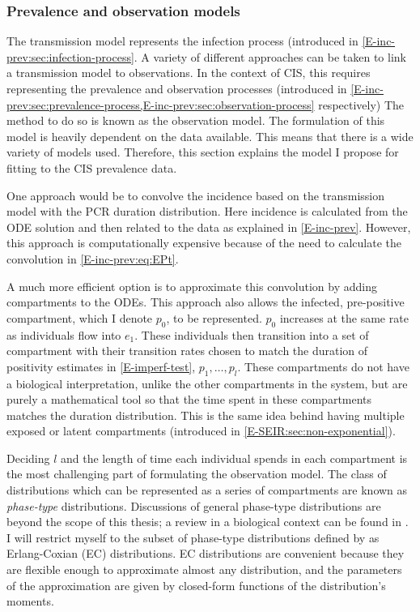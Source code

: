 \documentclass[thesis.tex]{subfiles}
\begin{document}
\subsubsection{Prevalence and observation models} \label{SEIR:sec:observation}

The transmission model represents the infection process (introduced in \cref{E-inc-prev:sec:infection-process}.
A variety of different approaches can be taken to link a transmission model to observations.
In the context of CIS, this requires representing the prevalence and observation processes (introduced in \cref{E-inc-prev:sec:prevalence-process,E-inc-prev:sec:observation-process} respectively)
The method to do so is known as the observation model.
The formulation of this model is heavily dependent on the data available.
This means that there is a wide variety of models used.
Therefore, this section  explains the model I propose for fitting to the CIS prevalence data.

One approach would be to convolve the incidence based on the transmission model with the PCR duration distribution.
Here incidence is calculated from the ODE solution and then related to the data as explained in \cref{E-inc-prev}.
However, this approach is computationally expensive because of the need to calculate the convolution in \cref{E-inc-prev:eq:EPt}.

A much more efficient option is to approximate this convolution by adding compartments to the ODEs.
This approach also allows the infected, pre-positive compartment, which I denote $p_0$, to be represented.
$p_0$ increases at the same rate as individuals flow into $e_1$.
These individuals then transition into a set of compartment with their transition rates chosen to match the duration of positivity estimates in \cref{E-imperf-test}, $p_1, \dots, p_l$.
These compartments do not have a biological interpretation, unlike the other compartments in the system, but are purely a mathematical tool so that the time spent in these compartments matches the duration distribution.
This is the same idea behind having multiple exposed or latent compartments (introduced in \cref{E-SEIR:sec:non-exponential}).

Deciding $l$ and the length of time each individual spends in each compartment is the most challenging part of formulating the observation model.
The class of distributions which can be represented as a series of compartments are known as \emph{phase-type} distributions.
Discussions of general phase-type distributions are beyond the scope of this thesis; a review in a biological context can be found in \textcite{hobolthPhasetype}.
I will restrict myself to the subset of phase-type distributions defined by \textcite{osogamiClosed} as Erlang-Coxian (EC) distributions.
EC distributions are convenient because they are flexible enough to approximate almost any distribution, and the parameters of the approximation are given by closed-form functions of the distribution's moments.
\end{document}
